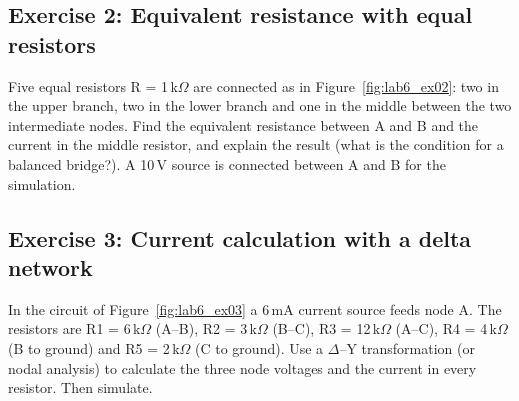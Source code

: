 
\subsection{Exercise 2: Equivalent resistance with equal resistors}
Five equal resistors R = 1\,k$\Omega$ are connected as in Figure~\ref{fig:lab6_ex02}: two in the upper branch, two in the lower branch and one in the middle between the two intermediate nodes. Find the equivalent resistance between A and B and the current in the middle resistor, and explain the result (what is the condition for a balanced bridge?). A 10\,V source is connected between A and B for the simulation.






\subsection{Exercise 3: Current calculation with a delta network}
In the circuit of Figure~\ref{fig:lab6_ex03} a 6\,mA current source feeds node A. The resistors are R1 = 6\,k$\Omega$ (A--B), R2 = 3\,k$\Omega$ (B--C), R3 = 12\,k$\Omega$ (A--C), R4 = 4\,k$\Omega$ (B to ground) and R5 = 2\,k$\Omega$ (C to ground). Use a $\Delta$--Y transformation (or nodal analysis) to calculate the three node voltages and the current in every resistor. Then simulate.

